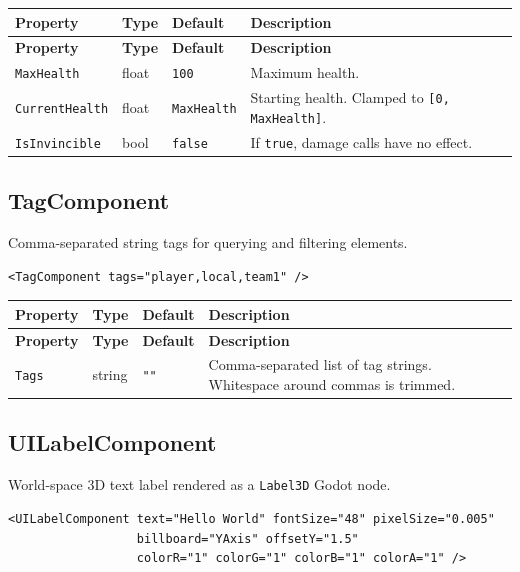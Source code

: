 \documentclass[11pt,a4paper]{article}
\begin{document}
\begin{longtable}{P{3.5cm} P{2cm} P{2.2cm} P{5.3cm}}
  \toprule
  \textbf{Property} & \textbf{Type} & \textbf{Default} & \textbf{Description} \\
  \midrule
  \endfirsthead
  \toprule
  \textbf{Property} & \textbf{Type} & \textbf{Default} & \textbf{Description} \\
  \midrule
  \endhead
  \texttt{MaxHealth} & float & \texttt{100} & Maximum health. \\
  \texttt{CurrentHealth} & float & \texttt{MaxHealth} &
    Starting health. Clamped to \texttt{[0, MaxHealth]}. \\
  \texttt{IsInvincible} & bool & \texttt{false} &
    If \texttt{true}, damage calls have no effect. \\
  \bottomrule
\end{longtable}

\subsection{TagComponent}

Comma-separated string tags for querying and filtering elements.

\begin{lstlisting}
<TagComponent tags="player,local,team1" />
\end{lstlisting}

\begin{longtable}{P{3cm} P{2cm} P{2.5cm} P{5.5cm}}
  \toprule
  \textbf{Property} & \textbf{Type} & \textbf{Default} & \textbf{Description} \\
  \midrule
  \endfirsthead
  \toprule
  \textbf{Property} & \textbf{Type} & \textbf{Default} & \textbf{Description} \\
  \midrule
  \endhead
  \texttt{Tags} & string & \texttt{""} &
    Comma-separated list of tag strings. Whitespace around commas is trimmed. \\
  \bottomrule
\end{longtable}

\subsection{UILabelComponent}

World-space 3D text label rendered as a \texttt{Label3D} Godot node.

\begin{lstlisting}
<UILabelComponent text="Hello World" fontSize="48" pixelSize="0.005"
                  billboard="YAxis" offsetY="1.5"
                  colorR="1" colorG="1" colorB="1" colorA="1" />
\end{lstlisting}
\end{document}
